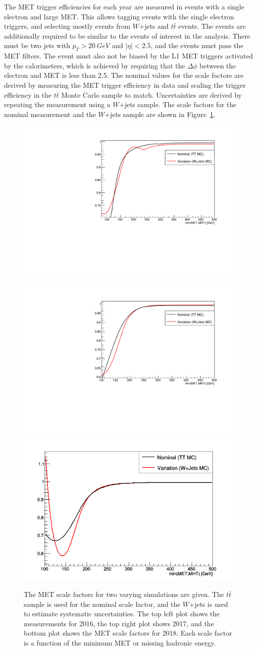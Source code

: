 The MET trigger efficiencies for each year are measured in events with a single electron and large MET.
This allows tagging events with the single electron triggers, and selecting mostly
events from $W$+jets and $t\bar{t}$ events.
The events are additionally required to be similar to the events of interest in the analysis.
There must be two jets with $p_T > \SI{20}{GeV}$ and $|\eta| < 2.5$,
and the events must pass the MET filters.
The event must also not be biased by the L1 MET triggers activated by the calorimeters,
which is achieved by requiring that the $\Delta\phi$ between the electron and MET is
less than 2.5.
The nominal values for the scale factors are derived by measuring
the MET trigger efficiency in data and scaling the trigger efficiency in
the $t\bar{t}$ Monte Carlo sample to match.
Uncertainties are derived by repeating the measurement using a $W$+jets sample.
The scale factors for the nominal measurement and the $W$+jets sample are shown in
Figure~\ref{fig:met-sf}.
\begin{figure}
  \centering
  \includegraphics[width=0.5\linewidth]{figures/METSF2016.pdf}~
  \includegraphics[width=0.5\linewidth]{figures/METSF2017.pdf}
  \includegraphics[width=0.5\linewidth]{figures/METSF2018.png}
  \caption[MET trigger scale factors]{
    The MET scale factors for two varying simulations are given.
    The $t\bar{t}$ sample is used for the nominal scale factor,
    and the $W$+jets is used to estimate systematic uncertainties.
    The top left plot shows the measurements for 2016,
    the top right plot shows 2017,
    and the bottom plot shows the MET scale factors for 2018.
    Each scale factor is a function of the minimum MET or missing hadronic energy.
  }
  \label{fig:met-sf}
\end{figure}

